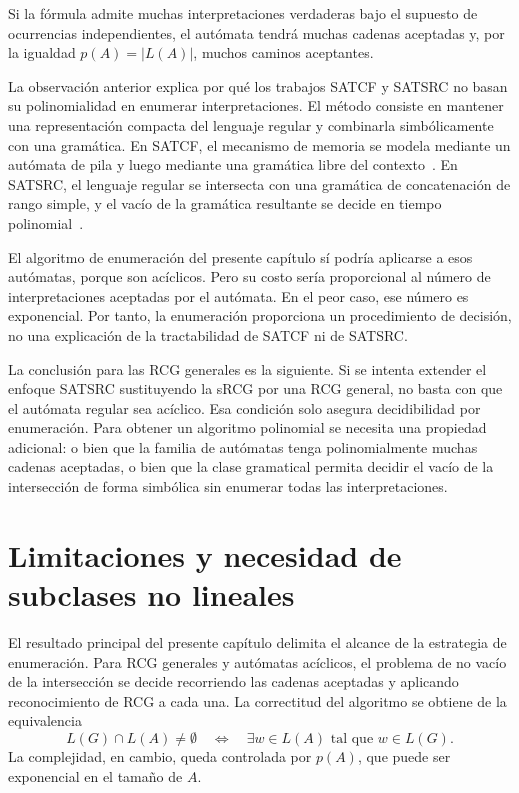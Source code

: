 \documentclass{report}
\theoremstyle{definition}
\theoremstyle{plain}
\theoremstyle{remark}
\begin{document}
Si la fórmula admite muchas interpretaciones verdaderas bajo el
supuesto de ocurrencias independientes, el autómata tendrá muchas
cadenas aceptadas y, por la igualdad $p(A)=|L(A)|$, muchos caminos
aceptantes.

La observación anterior explica por qué los trabajos SATCF y SATSRC no
basan su polinomialidad en enumerar interpretaciones. El método consiste
en mantener una representación compacta del lenguaje regular y combinarla
simbólicamente con una gramática. En SATCF, el mecanismo de memoria se
modela mediante un autómata de pila y luego mediante una gramática libre
del contexto~\cite{fernandezarias2007}. En SATSRC, el lenguaje regular
se intersecta con una gramática de concatenación de rango simple, y el
vacío de la gramática resultante se decide en tiempo
polinomial~\cite{aguileralopez2016}.

El algoritmo de enumeración del presente capítulo sí podría aplicarse a
esos autómatas, porque son acíclicos. Pero su costo sería
proporcional al número de interpretaciones aceptadas por el autómata. En
el peor caso, ese número es exponencial. Por tanto, la enumeración
proporciona un procedimiento de decisión, no una explicación de la
tractabilidad de SATCF ni de SATSRC.

La conclusión para las RCG generales es la siguiente. Si se intenta
extender el enfoque SATSRC sustituyendo la sRCG por una RCG general, no
basta con que el autómata regular sea acíclico. Esa
condición solo asegura decidibilidad por enumeración. Para obtener un
algoritmo polinomial se necesita una propiedad adicional: o bien que la
familia de autómatas tenga polinomialmente muchas cadenas aceptadas, o
bien que la clase gramatical permita decidir el vacío de la intersección
de forma simbólica sin enumerar todas las interpretaciones.

\section{Limitaciones y necesidad de subclases no lineales}
\label{sec:limitaciones-subclases}

El resultado principal del presente capítulo delimita el alcance de la
estrategia de enumeración. Para RCG generales y autómatas acíclicos, el
problema de no vacío de la intersección se decide
recorriendo las cadenas aceptadas y aplicando reconocimiento de RCG a
cada una. La correctitud del algoritmo se obtiene de la equivalencia
\[
  L(G) \cap L(A) \neq \emptyset
  \quad \Longleftrightarrow \quad
  \exists w \in L(A) \text{ tal que } w \in L(G).
\]
La complejidad, en cambio, queda controlada por $p(A)$, que puede ser
exponencial en el tamaño de $A$.
\end{document}
